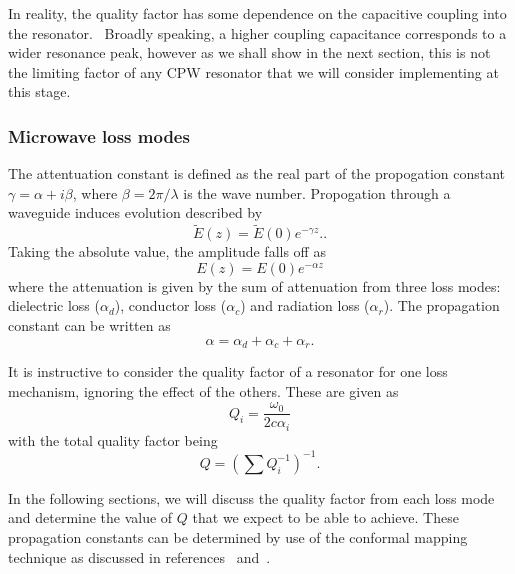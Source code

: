 In reality, the quality factor has some dependence on the capacitive coupling
into the resonator.~\cite{doi:10.1063/1.3010859} Broadly speaking, a higher
coupling capacitance corresponds to a wider resonance peak, however as we shall
show in the next section, this is not the limiting factor of any CPW resonator
that we will consider implementing at this stage.

\subsubsection{Microwave loss modes}


The attentuation constant is defined as the real part of the propogation
constant $\gamma = \alpha + i\beta$, where $\beta = 2\pi / \lambda$ is the wave
number.  Propogation through a waveguide induces evolution described by
\begin{equation}
  \widetilde{E}(z) = \widetilde{E}(0)e^{-\gamma z}.
  \label{experiment:mw:eqn:Eloss}.
\end{equation}
Taking the absolute value, the amplitude falls off as
\begin{equation}
  E(z) = E(0)e^{-\alpha z}
\end{equation}
where the attenuation is given by the sum of attenuation from three loss modes:
dielectric loss ($\alpha_d$), conductor loss ($\alpha_c$) and radiation loss
($\alpha_r$). The propagation constant can be written as
\begin{equation}
  \alpha = \alpha_d + \alpha_c + \alpha_r.
\end{equation}

It is instructive to consider the quality factor of a resonator for one loss
mechanism, ignoring the effect of the others. These are given as
\begin{equation}
  Q_i = \frac{\omega_0}{2c\alpha_i}
\end{equation}
with the total quality factor being
\begin{equation}
  Q = \left(\sum Q_i^{-1} \right)^{-1}.
\end{equation}

In the following sections, we will discuss the quality factor from
each loss mode and determine the value of $Q$ that we expect to be able to
achieve. These propagation constants can be determined by use of the conformal
mapping technique as discussed in references~\cite{1127105}
and~\cite{Collin2007}.

